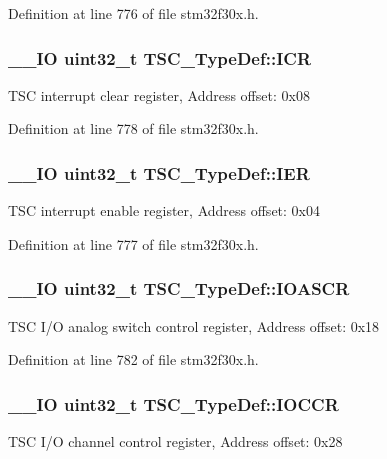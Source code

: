 Definition at line 776 of file stm32f30x.\-h.

\hypertarget{struct_t_s_c___type_def_a447b91de2a50d7ebde5716a8e7eda3ee}{
\subsubsection[{I\-C\-R}]{\setlength{\rightskip}{0pt plus 5cm}\-\_\-\-\_\-\-I\-O {\bf uint32\-\_\-t} T\-S\-C\-\_\-\-Type\-Def\-::\-I\-C\-R}}\label{struct_t_s_c___type_def_a447b91de2a50d7ebde5716a8e7eda3ee}
T\-S\-C interrupt clear register, Address offset\-: 0x08 

Definition at line 778 of file stm32f30x.\-h.

\hypertarget{struct_t_s_c___type_def_a6d83a90d85e3b545cf29e98eac11765e}{
\subsubsection[{I\-E\-R}]{\setlength{\rightskip}{0pt plus 5cm}\-\_\-\-\_\-\-I\-O {\bf uint32\-\_\-t} T\-S\-C\-\_\-\-Type\-Def\-::\-I\-E\-R}}\label{struct_t_s_c___type_def_a6d83a90d85e3b545cf29e98eac11765e}
T\-S\-C interrupt enable register, Address offset\-: 0x04 

Definition at line 777 of file stm32f30x.\-h.

\hypertarget{struct_t_s_c___type_def_af8a7f56b952ec2aba979eb8301e5800c}{
\subsubsection[{I\-O\-A\-S\-C\-R}]{\setlength{\rightskip}{0pt plus 5cm}\-\_\-\-\_\-\-I\-O {\bf uint32\-\_\-t} T\-S\-C\-\_\-\-Type\-Def\-::\-I\-O\-A\-S\-C\-R}}\label{struct_t_s_c___type_def_af8a7f56b952ec2aba979eb8301e5800c}
T\-S\-C I/\-O analog switch control register, Address offset\-: 0x18 

Definition at line 782 of file stm32f30x.\-h.

\hypertarget{struct_t_s_c___type_def_ad468fece7d1f454e0f8967edc9068c73}{
\subsubsection[{I\-O\-C\-C\-R}]{\setlength{\rightskip}{0pt plus 5cm}\-\_\-\-\_\-\-I\-O {\bf uint32\-\_\-t} T\-S\-C\-\_\-\-Type\-Def\-::\-I\-O\-C\-C\-R}}\label{struct_t_s_c___type_def_ad468fece7d1f454e0f8967edc9068c73}
T\-S\-C I/\-O channel control register, Address offset\-: 0x28 

